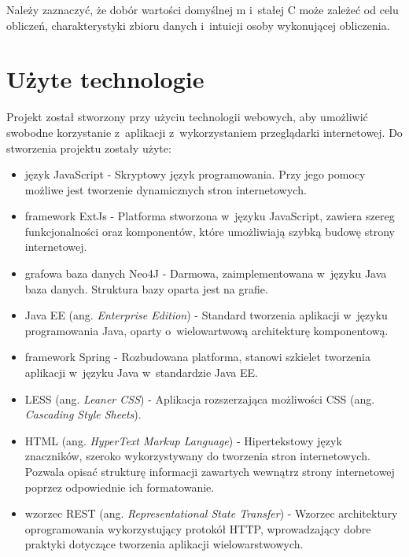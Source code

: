 Należy zaznaczyć, że dobór wartości domyślnej m i~stałej C może zależeć od celu obliczeń, charakterystyki zbioru danych i~intuicji osoby wykonującej obliczenia.

\section{Użyte technologie}
Projekt został stworzony przy użyciu technologii webowych, aby umożliwić swobodne korzystanie z~aplikacji z~wykorzystaniem przeglądarki internetowej. Do stworzenia projektu zostały użyte:
\begin{itemize}
\item język JavaScript - Skryptowy język programowania. Przy jego pomocy możliwe jest tworzenie dynamicznych stron internetowych.\cite{js}
\item framework ExtJs - Platforma stworzona w~języku JavaScript, zawiera szereg funkcjonalności oraz komponentów, które umożliwiają szybką budowę strony internetowej.\cite{extjs}
\item grafowa baza danych Neo4J - Darmowa, zaimplementowana w~języku Java baza danych. Struktura bazy oparta jest na grafie.
\item Java EE (ang. \textit{Enterprise Edition}) - Standard tworzenia aplikacji w~języku programowania Java, oparty o~wielowartwową architekturę komponentową.\cite{javaee}
\item framework Spring - Rozbudowana platforma, stanowi szkielet tworzenia aplikacji w~języku Java w~standardzie Java EE.\cite{springAction}
\item LESS (ang. \textit{Leaner CSS}) - Aplikacja rozszerzająca możliwości CSS (ang. \textit{Cascading Style Sheets}).\cite{LESS}
\item HTML (ang. \textit{HyperText Markup Language}) - Hipertekstowy język znaczników, szeroko wykorzystywany do tworzenia stron internetowych. Pozwala opisać strukturę informacji zawartych wewnątrz strony internetowej poprzez odpowiednie ich formatowanie.\cite{html}
\item wzorzec REST (ang. \textit{Representational State Transfer}) - Wzorzec architektury oprogramowania wykorzystujący protokół HTTP, wprowadzający dobre praktyki dotyczące tworzenia aplikacji wielowarstwowych.\cite{restWww}
\end{itemize}
